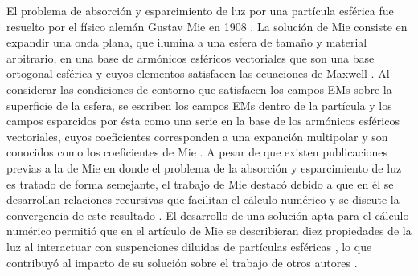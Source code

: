 El problema de absorción y esparcimiento de luz por una partícula esférica fue resuelto por el físico alemán Gustav Mie en 1908 \cite{mie1908metallosung}.  La solución de Mie consiste en expandir una onda plana, que ilumina a una esfera de tamaño y material arbitrario, en una base de armónicos esféricos vectoriales que son una base ortogonal esférica y cuyos elementos satisfacen las ecuaciones de Maxwell \cite{bohren1998absorption}. Al considerar las condiciones de contorno que satisfacen los campos EMs sobre la superficie de la esfera,  se escriben los campos EMs dentro de la partícula y los campos esparcidos por ésta como una serie en la base de los armónicos esféricos vectoriales, cuyos coeficientes corresponden a una expanción multipolar y son conocidos como los coeficientes de Mie \cite{bohren1998absorption}. A pesar de que existen publicaciones previas a la de Mie en donde  el problema de la absorción y esparcimiento de luz es tratado de forma semejante, el trabajo de Mie destacó debido a que en él se  desarrollan relaciones recursivas que facilitan el cálculo numérico y se discute la convergencia de este resultado \cite{horvath2009historic}. El desarrollo de una solución apta para el cálculo numérico permitió que en el artículo de Mie se describieran diez propiedades de la luz al interactuar con suspenciones diluidas de partículas esféricas \cite{mie1908metallosung}, lo que contribuyó al impacto de su solución sobre el trabajo de otros autores \cite{horvath2009historic}. 

